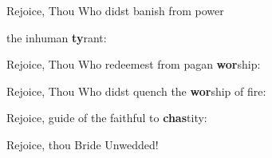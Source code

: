 
Rejoice, Thou Who didst banish from power

the inhuman \textbf{ty}rant:



Rejoice, Thou Who redeemest from pagan \textbf{wor}ship:


Rejoice, Thou Who didst quench the \textbf{wor}ship of fire:


Rejoice, guide of the faithful to \textbf{chas}tity:


Rejoice, thou Bride Unwedded!

\pagebreak

